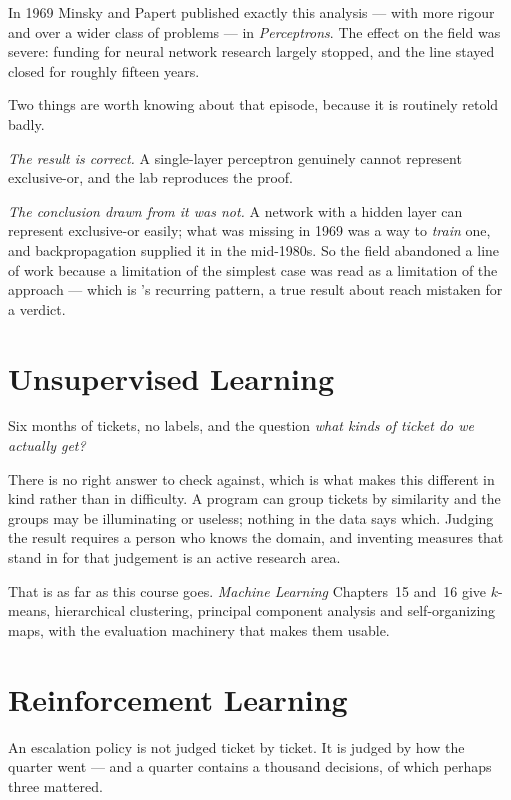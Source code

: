 \begin{conceptbox}
In 1969 Minsky and Papert published exactly this analysis --- with more rigour and
over a wider class of problems --- in \emph{Perceptrons}. The effect on the field was
severe: funding for neural network research largely stopped, and the line stayed
closed for roughly fifteen years.

Two things are worth knowing about that episode, because it is routinely retold
badly.

\emph{The result is correct.} A single-layer perceptron genuinely cannot represent
exclusive-or, and the lab reproduces the proof.

\emph{The conclusion drawn from it was not.} A network with a hidden layer can
represent exclusive-or easily; what was missing in 1969 was a way to \emph{train}
one, and backpropagation supplied it in the mid-1980s. So the field abandoned a
line of work because a limitation of the simplest case was read as a limitation of
the approach --- which is 's recurring pattern, a true result
about reach mistaken for a verdict.
\end{conceptbox}

\section{Unsupervised Learning}

Six months of tickets, no labels, and the question \emph{what kinds of ticket do we
actually get?}

There is no right answer to check against, which is what makes this different in
kind rather than in difficulty. A program can group tickets by similarity and the
groups may be illuminating or useless; nothing in the data says which. Judging the
result requires a person who knows the domain, and inventing measures that stand in
for that judgement is an active research area.

That is as far as this course goes. \emph{Machine Learning} Chapters~15 and~16 give
$k$-means, hierarchical clustering, principal component analysis and
self-organizing maps, with the evaluation machinery that makes them usable.

\section{Reinforcement Learning}

An escalation policy is not judged ticket by ticket. It is judged by how the quarter
went --- and a quarter contains a thousand decisions, of which perhaps three
mattered.


